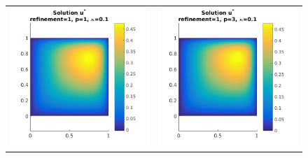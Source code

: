 \documentclass{article}
\begin{document}
\begin{figure}[!ht]
\begin{tabular}{c c}
\includegraphics[scale=0.7]{umustar_122.png} &
\includegraphics[scale=0.7]{umustar_222.png} \\

\end{tabular}
\end{figure}
\end{document}
